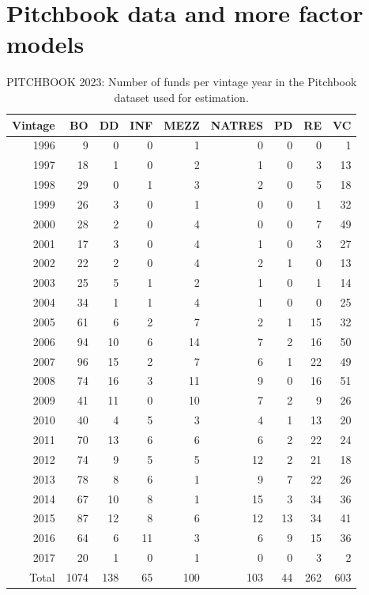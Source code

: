 \clearpage


\section{Pitchbook data and more factor models}
\label{sec:pitchbook}

\begin{table}[ht]
	\centering
	\begin{tabular}{rrrrrrrrr}
		Vintage & BO & DD & INF & MEZZ & NATRES & PD & RE & VC \\ 
		\hline
		\hline
		1996 &   9 &   0 &   0 &   1 &   0 &   0 &   0 &   1 \\ 
		1997 &  18 &   1 &   0 &   2 &   1 &   0 &   3 &  13 \\ 
		1998 &  29 &   0 &   1 &   3 &   2 &   0 &   5 &  18 \\ 
		1999 &  26 &   3 &   0 &   1 &   0 &   0 &   1 &  32 \\ 
		2000 &  28 &   2 &   0 &   4 &   0 &   0 &   7 &  49 \\ 
		2001 &  17 &   3 &   0 &   4 &   1 &   0 &   3 &  27 \\ 
		2002 &  22 &   2 &   0 &   4 &   2 &   1 &   0 &  13 \\ 
		2003 &  25 &   5 &   1 &   2 &   1 &   0 &   1 &  14 \\ 
		2004 &  34 &   1 &   1 &   4 &   1 &   0 &   0 &  25 \\ 
		2005 &  61 &   6 &   2 &   7 &   2 &   1 &  15 &  32 \\ 
		2006 &  94 &  10 &   6 &  14 &   7 &   2 &  16 &  50 \\ 
		2007 &  96 &  15 &   2 &   7 &   6 &   1 &  22 &  49 \\ 
		2008 &  74 &  16 &   3 &  11 &   9 &   0 &  16 &  51 \\ 
		2009 &  41 &  11 &   0 &  10 &   7 &   2 &   9 &  26 \\ 
		2010 &  40 &   4 &   5 &   3 &   4 &   1 &  13 &  20 \\ 
		2011 &  70 &  13 &   6 &   6 &   6 &   2 &  22 &  24 \\ 
		2012 &  74 &   9 &   5 &   5 &  12 &   2 &  21 &  18 \\ 
		2013 &  78 &   8 &   6 &   1 &   9 &   7 &  22 &  26 \\ 
		2014 &  67 &  10 &   8 &   1 &  15 &   3 &  34 &  36 \\ 
		2015 &  87 &  12 &   8 &   6 &  12 &  13 &  34 &  41 \\ 
		2016 &  64 &   6 &  11 &   3 &   6 &   9 &  15 &  36 \\ 
		2017 &  20 &   1 &   0 &   1 &   0 &   0 &   3 &   2 \\ 
		\hline
		Total & 1074 & 138 &  65 & 100 & 103 &  44 & 262 & 603 \\ 
		\hline
		\hline
	\end{tabular}
	\caption{PITCHBOOK 2023: Number of funds per vintage year in the Pitchbook dataset used for estimation.} 
	\label{tab:pitchbook_data}
\end{table}


